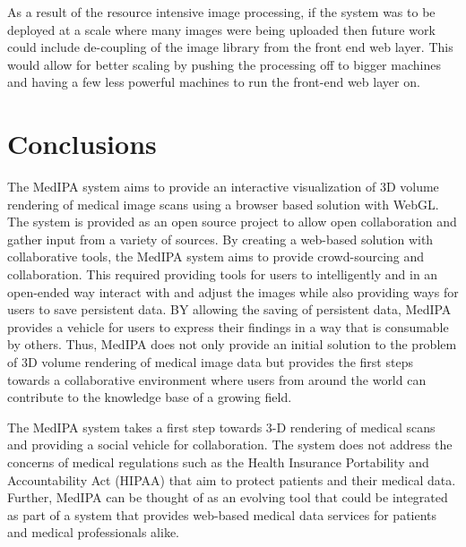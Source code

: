 \documentclass[annual]{acmsiggraph}
\begin{document}
	As a result of the resource intensive image processing, if the system was to be deployed at a scale where many images were being uploaded then future work could include de-coupling of the image library from the front end web layer.  This would allow for better scaling by pushing the processing off to bigger machines and having a few less powerful machines to run the front-end web layer on.

\section{Conclusions}

	The MedIPA system aims to provide an interactive visualization of 3D volume rendering of medical image scans using a browser based solution with WebGL.  The system is provided as an open source project to allow open collaboration and gather input from a variety of sources.  By creating a web-based solution with collaborative tools, the MedIPA system aims to provide crowd-sourcing and collaboration.  This required providing tools for users to intelligently and in an open-ended way interact with and adjust the images while also providing ways for users to save persistent data.  BY allowing the saving of persistent data, MedIPA provides a vehicle for users to express their findings in a way that is consumable by others.  Thus, MedIPA does not only provide an initial solution to the problem of 3D volume rendering of medical image data but provides the first steps towards a collaborative environment where users from around the world can contribute to the knowledge base of a growing field.
	
	The MedIPA system takes a first step towards 3-D rendering of medical scans and providing a social vehicle for collaboration.  The system does not address the concerns of medical regulations such as the Health Insurance Portability and Accountability Act (HIPAA) that aim to protect patients and their medical data.  Further, MedIPA can be thought of as an evolving tool that could be integrated as part of a system that provides web-based medical data services for patients and medical professionals alike.



\end{document}
